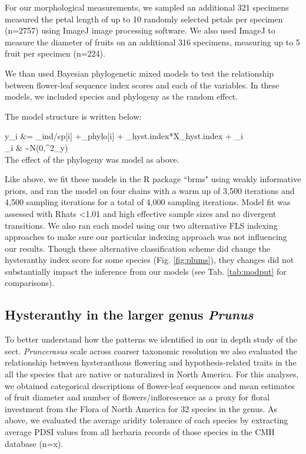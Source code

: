 \documentclass{article}[11pt]
\begin{document}
\noindent For our morphological measurements, we sampled an additional 321 specimens measured the petal length of up to 10 randomly selected petals per specimen (n=2757) using ImageJ image processing software. We also used ImageJ to measure the diameter of fruits on an additional 316 specimens, measuring up to 5 fruit per specimen (n=224).

We than used Bayesian phylogenetic mixed models to test the relationship between flower-leaf sequence index scores and each of the variables. In these models, we included species and phylogeny as the random effect. 

The model structure is written below: 

  y_i &= \alpha_{ind/sp[i]} +\alpha_{phylo[i]} + \beta_{hyst.index}*X_{hyst.index} + \epsilon_i\\
  
  \epsilon_i & \sim N(0,\sigma^2_y) \\ %
  
  \noindent The effect of the phylogeny was model as above.%
  
Like above, we fit these models in the R package ``brms" \citep{Burkner2018} using weakly informative priors, and ran the model on four chains with a warm up of 3,500 iterations and 4,500 sampling iterations for a total of 4,000 sampling iterations. Model fit was assessed with Rhats <1.01 and high effective sample sizes and no divergent transitions. We also ran each model using our two alternative FLS indexing approaches to make sure our particular indexing approach was not influencing our results. Though these alternative classification scheme did change the hysteranthy index score for some species (Fig. \ref{fig:plums}), they changes did not substantially impact the inference from our models (see Tab. \ref{tab:modput} for comparisons).

\subsection*{Hysteranthy in the larger genus \textit{Prunus}}

To better understand how the patterns we identified in our in depth study of the sect. \textit{Pruncerasus} scale across coarser taxonomic resolution we also evaluated the relationship between hysteranthous flowering and hypothesis-related traits in the all the  species that are native or naturalized in North America. For this analyses, we obtained categorical descriptions of flower-leaf sequences and mean estimates of fruit diameter and number of flowers/inflorescence as a proxy for floral investment from the Flora of North America \citep{} for 32 species in the genus. As above, we evaluated the average aridity tolerance of each species by extracting average PDSI values from all herbaria records of those species in the CMH database (n=x). 
 
\end{document}
